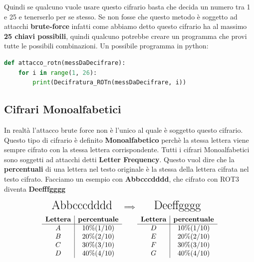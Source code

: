 \documentclass{report}
\begin{document}
Quindi se qualcuno vuole usare questo cifrario basta che decida un numero tra 1 e 25 e tenerserlo per se stesso. Se non fosse che questo metodo è soggetto ad attacchi \textbf{brute-force} infatti come abbiamo detto questo cifrario ha al massimo \textbf{25 chiavi possibili}, quindi qualcuno potrebbe creare un programma che provi tutte le possibili combinazioni. Un possibile programma in python: 

\begin{lstlisting}[language=Python]
def attacco_rotn(messDaDecifrare):
    for i in range(1, 26):
        print(Decifratura_ROTn(messDaDecifrare, i))
\end{lstlisting}


\newpage

\subsection{Cifrari Monoalfabetici}
In realtà l'attacco brute force non è l'unico al quale è soggetto questo cifrario. Questo tipo di cifrario è definito \textbf{Monoalfabetico} perchè la stessa lettera viene sempre cifrato con la stessa lettera corrispondente. Tutti i cifrari Monoalfabetici sono soggetti ad attacchi detti \textbf{Letter Frequency}. Questo vuol dire che la \textbf{percentuali} di una lettera nel testo originale è la stessa della lettera cifrata nel testo cifrato. Facciamo un esempio con \textbf{Abbcccdddd}, che cifrato con ROT3 diventa \textbf{Deefffgggg}

\vspace{0.2cm}
\[
\begin{array}{c@{\hskip 0.1cm}c@{\hskip 0.1cm}c}
  \text{\LARGE Abbcccdddd} & \Longrightarrow & \text{\LARGE Deeffgggg} \\[0.2cm]

  \begin{array}{c|c}
    \textbf{Lettera} & \textbf{percentuale} \\
    \hline
    A & 10\% (1/10) \\
    B & 20\% (2/10) \\
    C & 30\% (3/10) \\
    D & 40\% (4/10) \\
  \end{array}
  &
  &
  \begin{array}{c|c}
    \textbf{Lettera} & \textbf{percentuale} \\
    \hline
    D & 10\% (1/10) \\
    E & 20\% (2/10) \\
    F & 30\% (3/10) \\
    G & 40\% (4/10) \\
  \end{array}
\end{array}
\]
\end{document}
